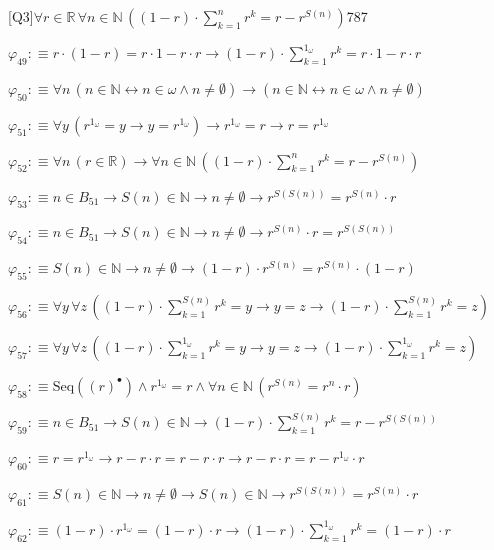 \begin{fullproof}{[Q3]}{$\forall r \in \mathbb{R}\,\forall n \in \mathbb{N}\,((1 - r) \cdot {\textstyle\sum_{k=1}^{n} {{r}^{k}}} = r - {{r}^{S(n)}})$}{787}
\begin{abbrevlist}
\item $\varphi_{49} :\equiv r \cdot (1 - r) = r \cdot 1 - r \cdot r \to (1 - r) \cdot {\textstyle\sum_{k=1}^{1_{\omega}} {{r}^{k}}} = r \cdot 1 - r \cdot r$
\item $\varphi_{50} :\equiv \forall n\,(n \in \mathbb{N} \leftrightarrow n \in \omega \land n \neq \emptyset) \to (n \in \mathbb{N} \leftrightarrow n \in \omega \land n \neq \emptyset)$
\item $\varphi_{51} :\equiv \forall y\,({{r}^{1_{\omega}}} = y \to y = {{r}^{1_{\omega}}}) \to {{r}^{1_{\omega}}} = r \to r = {{r}^{1_{\omega}}}$
\item $\varphi_{52} :\equiv \forall n\,(r \in \mathbb{R}) \to \forall n \in \mathbb{N}\,((1 - r) \cdot {\textstyle\sum_{k=1}^{n} {{r}^{k}}} = r - {{r}^{S(n)}})$
\item $\varphi_{53} :\equiv n \in B_{51} \to S(n) \in \mathbb{N} \to n \neq \emptyset \to {{r}^{S(S(n))}} = {{r}^{S(n)}} \cdot r$
\item $\varphi_{54} :\equiv n \in B_{51} \to S(n) \in \mathbb{N} \to n \neq \emptyset \to {{r}^{S(n)}} \cdot r = {{r}^{S(S(n))}}$
\item $\varphi_{55} :\equiv S(n) \in \mathbb{N} \to n \neq \emptyset \to (1 - r) \cdot {{r}^{S(n)}} = {{r}^{S(n)}} \cdot (1 - r)$
\item $\varphi_{56} :\equiv \forall y\,\forall z\,((1 - r) \cdot {\textstyle\sum_{k=1}^{S(n)} {{r}^{k}}} = y \to y = z \to (1 - r) \cdot {\textstyle\sum_{k=1}^{S(n)} {{r}^{k}}} = z)$
\item $\varphi_{57} :\equiv \forall y\,\forall z\,((1 - r) \cdot {\textstyle\sum_{k=1}^{1_{\omega}} {{r}^{k}}} = y \to y = z \to (1 - r) \cdot {\textstyle\sum_{k=1}^{1_{\omega}} {{r}^{k}}} = z)$
\item $\varphi_{58} :\equiv \mathrm{Seq}({(r)^{\bullet}}) \land {{r}^{1_{\omega}}} = r \land \forall n \in \mathbb{N}\,({{r}^{S(n)}} = {{r}^{n}} \cdot r)$
\item $\varphi_{59} :\equiv n \in B_{51} \to S(n) \in \mathbb{N} \to (1 - r) \cdot {\textstyle\sum_{k=1}^{S(n)} {{r}^{k}}} = r - {{r}^{S(S(n))}}$
\item $\varphi_{60} :\equiv r = {{r}^{1_{\omega}}} \to r - r \cdot r = r - r \cdot r \to r - r \cdot r = r - {{r}^{1_{\omega}}} \cdot r$
\item $\varphi_{61} :\equiv S(n) \in \mathbb{N} \to n \neq \emptyset \to S(n) \in \mathbb{N} \to {{r}^{S(S(n))}} = {{r}^{S(n)}} \cdot r$
\item $\varphi_{62} :\equiv (1 - r) \cdot {{r}^{1_{\omega}}} = (1 - r) \cdot r \to (1 - r) \cdot {\textstyle\sum_{k=1}^{1_{\omega}} {{r}^{k}}} = (1 - r) \cdot r$

\end{abbrevlist}
\end{fullproof}

